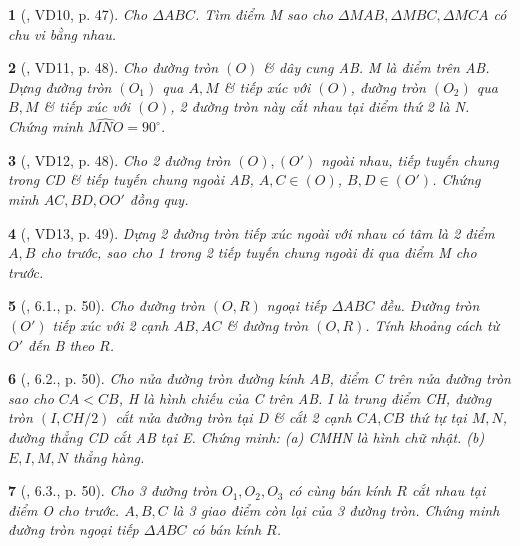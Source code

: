 \documentclass{article}
\newtheorem{baitoan}{}
\begin{document}
\begin{baitoan}[\cite{TLCT_THCS_Toan_9_hinh_hoc}, VD10, p. 47]
	Cho $\Delta ABC$. Tìm điểm M sao cho $\Delta MAB,\Delta MBC,\Delta MCA$ có chu vi bằng nhau.
\end{baitoan}

\begin{baitoan}[\cite{TLCT_THCS_Toan_9_hinh_hoc}, VD11, p. 48]
	Cho đường tròn $(O)$ \& dây cung AB. M là điểm trên AB. Dựng đường tròn $(O_1)$ qua $A,M$ \& tiếp xúc với $(O)$, đường tròn $(O_2)$ qua $B,M$ \& tiếp xúc với $(O)$, 2 đường tròn này cắt nhau tại điểm thứ 2 là N. Chứng minh $\widehat{MNO} = 90^\circ$.
\end{baitoan}

\begin{baitoan}[\cite{TLCT_THCS_Toan_9_hinh_hoc}, VD12, p. 48]
	Cho 2 đường tròn $(O),(O')$ ngoài nhau, tiếp tuyến chung trong CD \& tiếp tuyến chung ngoài AB, $A,C\in(O)$, $B,D\in(O')$. Chứng minh $AC,BD,OO'$ đồng quy.
\end{baitoan}

\begin{baitoan}[\cite{TLCT_THCS_Toan_9_hinh_hoc}, VD13, p. 49]
	Dựng 2 đường tròn tiếp xúc ngoài với nhau có tâm là 2 điểm $A,B$ cho trước, sao cho 1 trong 2 tiếp tuyến chung ngoài đi qua điểm M cho trước.
\end{baitoan}

\begin{baitoan}[\cite{TLCT_THCS_Toan_9_hinh_hoc}, 6.1., p. 50]
	Cho đường tròn $(O,R)$ ngoại tiếp $\Delta ABC$ đều. Đường tròn $(O')$ tiếp xúc với 2 cạnh $AB,AC$ \& đường tròn $(O,R)$. Tính khoảng cách từ $O'$ đến B theo $R$.
\end{baitoan}

\begin{baitoan}[\cite{TLCT_THCS_Toan_9_hinh_hoc}, 6.2., p. 50]
	Cho nửa đường tròn đường kính AB, điểm C trên nửa đường tròn sao cho $CA < CB$, H là hình chiếu của C trên AB. I là trung điểm CH, đường tròn $(I,CH/2)$ cắt nửa đường tròn tại D \& cắt 2 cạnh $CA,CB$ thứ tự tại $M,N$, đường thẳng CD cắt AB tại E. Chứng minh: (a) CMHN là hình chữ nhật. (b) $E,I,M,N$ thẳng hàng.
\end{baitoan}

\begin{baitoan}[\cite{TLCT_THCS_Toan_9_hinh_hoc}, 6.3., p. 50]
	Cho 3 đường tròn $O_1,O_2,O_3$ có cùng bán kính $R$ cắt nhau tại điểm O cho trước. $A,B,C$ là 3 giao điểm còn lại của 3 đường tròn. Chứng minh đường tròn ngoại tiếp $\Delta ABC$ có bán kính $R$.
\end{baitoan}
\end{document}
